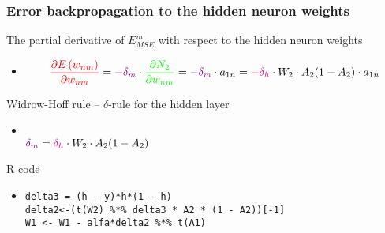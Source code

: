 \documentclass[proffesionalfonts]{beamer}
\begin{document}
\begin{frame}[fragile]
\frametitle{Error backpropagation to the hidden neuron weights}
\begin{block}{The partial derivative of $E_{MSE}^m$ with respect to the hidden neuron weights}
\begin{itemize}
\item[\ ]
\[ \textcolor{red}{\frac{\partial E \left( w_{nm} \right) }{ \partial w_{nm} }} = \textcolor{violet}{- \delta_m} \cdot \textcolor{green}{\frac{ \partial N_2 }{ \partial w_{nm} }} = \textcolor{violet}{- \delta_m} \cdot a_{1n} = \textcolor{magenta}{- \delta_h} \cdot W_2 \cdot A_2(1 - A_2) \cdot a_{1n}  \]
\end{itemize}
\end{block}
\begin{block}{Widrow-Hoff rule -- $\delta$-rule for the hidden layer}
\begin{itemize}
\item[\ ]
\\
$\textcolor{violet}{\delta_m} = \textcolor{magenta}{\delta_h} \cdot W_2 \cdot A_2(1 - A_2)$ \quad {}
\end{itemize}
\end{block}
\begin{block}{R code}
\begin{itemize}
\item[\ ]
\begin{verbatim}
delta3 = (h - y)*h*(1 - h)
delta2<-(t(W2) %*% delta3 * A2 * (1 - A2))[-1]
W1 <- W1 - alfa*delta2 %*% t(A1)
\end{verbatim}
\end{itemize}
\end{block}
\end{frame}
\end{document}

